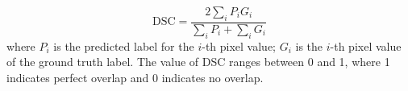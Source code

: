 \begin{equation}
	\label{e:dsc2}
	\text{DSC} = \frac{2\sum_{i}P_iG_i}{\sum_{i}P_i+\sum_{i}G_i}
\end{equation}
where $P_i$ is the predicted label for the $i$-th pixel value; $G_i$ is the $i$-th pixel value of the ground truth label. The value of DSC ranges between 0 and 1, where 1 indicates perfect overlap and 0 indicates no overlap.

